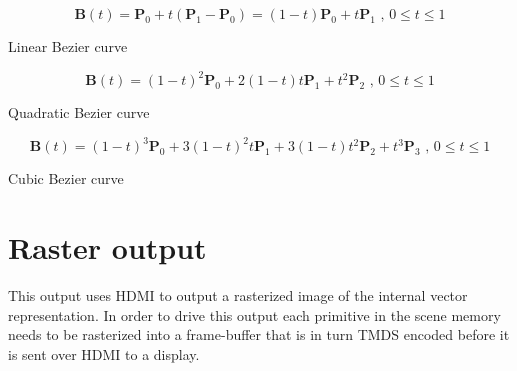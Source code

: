 \begin{cequation}[H]
	\begin{equation*}
		\mathbf{B}(t)=\mathbf{P}_0 + t(\mathbf{P}_1-\mathbf{P}_0)=(1-t)\mathbf{P}_0 + t\mathbf{P}_1 \mbox{ , } 0 \le t \le 1
	\end{equation*}
	\caption{Linear Bezier curve}
\end{cequation}

\begin{cequation}[H]
	\begin{equation*}
		\mathbf{B}(t) = (1 - t)^{2}\mathbf{P}_0 + 2(1 - t)t\mathbf{P}_1 + t^{2}\mathbf{P}_2 \mbox{ , } 0 \le t \le 1
	\end{equation*}
	\caption{Quadratic Bezier curve}
\end{cequation}

\begin{cequation}[H]
	\begin{equation*}
		\mathbf{B}(t)=(1-t)^3\mathbf{P}_0+3(1-t)^2t\mathbf{P}_1+3(1-t)t^2\mathbf{P}_2+t^3\mathbf{P}_3 \mbox{ , } 0 \le t \le 1
	\end{equation*}
	\caption{Cubic Bezier curve}
\end{cequation}


\section{Raster output}

This output uses HDMI to output a rasterized image of the internal vector representation.
In order to drive this output each primitive in the scene memory needs to be rasterized into a frame-buffer that is in turn TMDS encoded before it is sent over HDMI to a display.